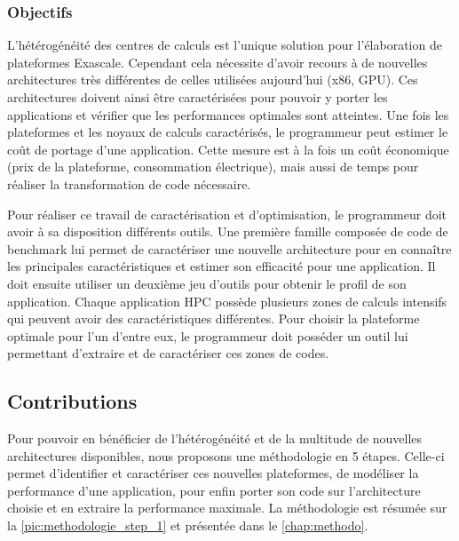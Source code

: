     \subsubsection{Objectifs}

        L'hétérogénéité des centres de calculs est l'unique solution pour l'élaboration de plateformes Exascale. Cependant cela nécessite d'avoir recours à de nouvelles architectures très différentes de celles utilisées aujourd'hui (x86, GPU). Ces architectures doivent ainsi être caractérisées pour pouvoir y porter les applications et vérifier que les performances optimales sont atteintes. Une fois les plateformes et les noyaux de calculs caractérisés, le programmeur peut estimer le coût de portage d'une application. Cette mesure est à la fois un coût économique (prix de la plateforme, consommation électrique), mais aussi de temps pour réaliser la transformation de code nécessaire.
        
        Pour réaliser ce travail de caractérisation et d'optimisation, le programmeur doit avoir à sa disposition différents outils. Une première famille composée de code de benchmark lui permet de caractériser une nouvelle architecture pour en connaître les principales caractéristiques et estimer son efficacité pour une application. 
        Il doit ensuite utiliser un deuxième jeu d'outils pour obtenir le profil de son application. Chaque application HPC possède plusieurs zones de calculs intensifs qui peuvent avoir des caractéristiques différentes. Pour choisir la plateforme optimale pour l'un d'entre eux, le programmeur doit posséder un outil lui permettant d'extraire et de caractériser ces zones de codes.
        
      

\subsection{Contributions}

        Pour pouvoir en bénéficier de l'hétérogénéité et de la multitude de nouvelles architectures disponibles, nous proposons une méthodologie en 5 étapes. Celle-ci permet d'identifier et caractériser ces nouvelles plateformes, de modéliser la performance d'une application, pour enfin porter son code sur l'architecture choisie et en extraire la performance maximale. La méthodologie est résumée sur la \autoref{pic:methodologie_step_1} et présentée dans le \autoref{chap:methodo}.

